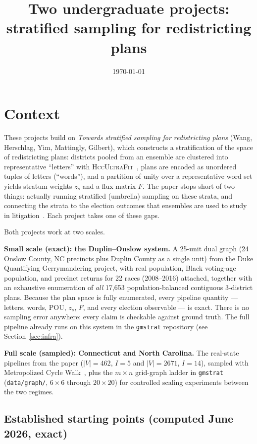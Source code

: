 \documentclass[11pt]{article}
\title{Two undergraduate projects:\\ stratified sampling for redistricting plans}
\author{}
\date{\today}
\newcommand{\hccultra}{\textsc{HccUltraFit}}
\begin{document}
\maketitle

\section{Context}

These projects build on \emph{Towards stratified sampling for
redistricting plans} (Wang, Herschlag, Yim, Mattingly, Gilbert), which
constructs a stratification of the space of redistricting plans:
districts pooled from an ensemble are clustered into representative
``letters'' with \hccultra{}~\cite{yim2024}, plans are encoded as
unordered tuples of letters (``words''), and a partition of unity over
a representative word set yields stratum weights $z_s$ and a flux
matrix $F$. The paper stops short of two things: actually running
stratified (umbrella) sampling on these strata, and connecting the
strata to the election outcomes that ensembles are used to study in
litigation~\cite{herschlag2020}. Each project takes one of these gaps.

Both projects work at two scales.

\textbf{Small scale (exact): the Duplin--Onslow system.} A 25-unit
dual graph (24 Onslow County, NC precincts plus Duplin County as a
single unit) from the Duke Quantifying Gerrymandering project, with
real population, Black voting-age population, and precinct returns for
22 races (2008--2016) attached, together with an exhaustive
enumeration of \emph{all} 17{,}653 population-balanced contiguous
3-district plans. Because the plan space is fully enumerated, every
pipeline quantity --- letters, words, POU, $z_s$, $F$, and every
election observable --- is exact. There is no sampling error anywhere:
every claim is checkable against ground truth. The full pipeline
already runs on this system in the \texttt{gmstrat} repository (see
Section~\ref{sec:infra}).

\textbf{Full scale (sampled): Connecticut and North Carolina.} The
real-state pipelines from the paper ($|V|=462$, $I=5$ and $|V|=2671$,
$I=14$), sampled with Metropolized Cycle Walk~\cite{cyclewalk}, plus
the $m\times n$ grid-graph ladder in \texttt{gmstrat}
(\texttt{data/graph/}, $6\times6$ through $20\times20$) for controlled
scaling experiments between the two regimes.

\subsection*{Established starting points (computed June 2026, exact)}
\end{document}
